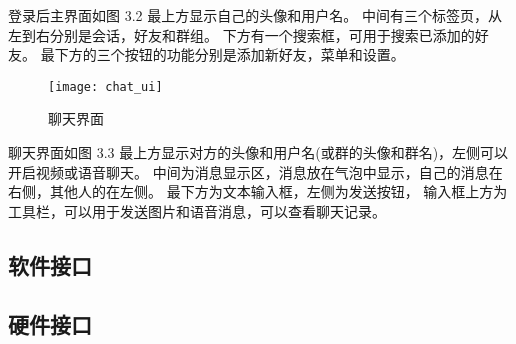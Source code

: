 登录后主界面如图 3.2
最上方显示自己的头像和用户名。
中间有三个标签页，从左到右分别是会话，好友和群组。
下方有一个搜索框，可用于搜索已添加的好友。
最下方的三个按钮的功能分别是添加新好友，菜单和设置。

\begin{figure}[h]
	\centering
	\texttt{[image: chat\_ui]}
	\caption{聊天界面} \label{fig:chat_ui}
\end{figure}

聊天界面如图 3.3
最上方显示对方的头像和用户名(或群的头像和群名)，左侧可以开启视频或语音聊天。
中间为消息显示区，消息放在气泡中显示，自己的消息在右侧，其他人的在左侧。
最下方为文本输入框，左侧为发送按钮，
输入框上方为工具栏，可以用于发送图片和语音消息，可以查看聊天记录。


\subsection{软件接口}
% 
% 
% 
% 
% 
% 
% 


\subsection{硬件接口}
% 
% 
% 
% 
%  

